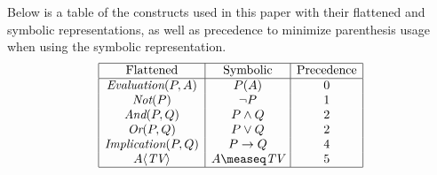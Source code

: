 \documentclass[runningheads]{llncs}
\newcommand{\TEval}{\textit{Evaluation}}
\newcommand{\TList}{\textit{List}}
\newcommand{\TAnd}{\textit{And}}
\newcommand{\TOr}{\textit{Or}}
\newcommand{\TNot}{\textit{Not}}
\newcommand{\TImpl}{\textit{Implication}}
\newcommand{\TTV}{\textit{TV}}
\newcommand{\TBTV}{\langle \TTV \rangle}
\newcommand{\limp}{\rightarrow}
\begin{document}
Below is a table of the constructs used in this paper with their
flattened and symbolic representations, as well as precedence to
minimize parenthesis usage when using the symbolic representation.
\renewcommand{\arraystretch}{1.5}
$$
\begin{array}{|c|c|c|}
  \hline
  \text{Flattened} & \text{Symbolic} & \text{Precedence} \\
  \hline
  \TEval(P, A) & P(A) & 0 \\
  \TNot(P) & \lnot P & 1 \\
  \TAnd(P, Q) & P \land Q & 2 \\
  \TOr(P, Q) & P \lor Q & 2 \\
  \TImpl(P, Q) & P \limp Q & 4 \\
  A \TBTV & A \measeq \TTV & 5 \\
  \hline
\end{array}
$$
\renewcommand{\arraystretch}{1}
\end{document}
